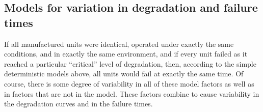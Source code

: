 \subsection{Models for variation in degradation and failure times}
\label{section:models.for.variation}
If all manufactured units were identical, operated 
under exactly the same conditions, and in exactly the same
environment, and if every unit failed as it reached a particular
``critical'' level of degradation, then, according to the simple deterministic
models above, all units would fail at
exactly the same time.  Of course, there is some degree of variability
in all of these model factors as well as in factors that are not in the
model. These factors combine to cause variability in the degradation 
curves and in the failure times.

